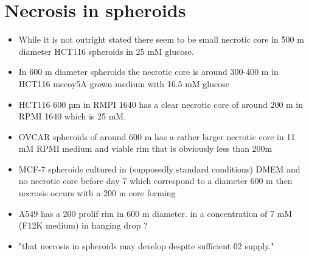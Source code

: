 \documentclass[11pt,a4paper]{article}
\begin{document}
\section{Necrosis in spheroids}
\begin{itemize}
\item While it is not outright stated there seem to be small necrotic core in  500 \textmu m diameter HCT116 spheroids in 25 mM glucose. \cite{Klaudia2023}

\item In 600 \textmu m diameter spheroids the necrotic core is around 300-400 \textmu m in HCT116 mccoy5A grown medium with 16.5 mM glucose  \cite{Huang2017}

\item HCT116 600 µm in RMPI 1640 has a clear necrotic core of around 200 \textmu m in RPMI 1640 which is 25 mM. \cite{Schaefer2023}

\item OVCAR spheroids of around 600 \textmu m has a rather larger necrotic core in 11 mM RPMI medium and viable rim that is obviously less than 200\textmu m  \cite{Yan2021} 

\item MCF-7 spheroids cultured in (supposedly standard conditions) DMEM and no necrotic core before day 7 which correspond to a diameter 600 \textmu m then necrosis occurs with a 200 \textmu m core forming \cite{Lee2010}



\item A549 has a 200 \textmu prolif rim in 600 \textmu m diameter. in a concentration of 7 mM (F12K medium) in hanging drop ?\cite{Zanoni2016}

\item "that necrosis in spheroids may
develop despite sufficient 02 supply."\cite{MullerKlieser1986}


\end{itemize}
\end{document}

